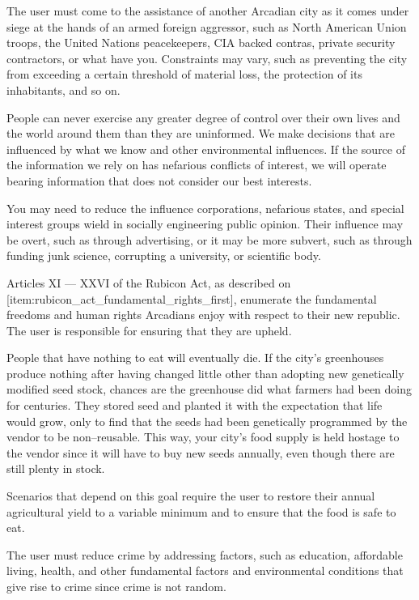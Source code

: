 
The user must come to the assistance of another Arcadian city as it comes under siege at the hands of an armed foreign aggressor, such as North American Union troops, the United Nations peacekeepers, CIA backed contras, private security contractors, or what have you. Constraints may vary, such as preventing the city from exceeding a certain threshold of material loss, the protection of its inhabitants, and so on.


People can never exercise any greater degree of control over their own lives and the world around them than they are uninformed. We make decisions that are influenced by what we know and other environmental influences. If the source of the information we rely on has nefarious conflicts of interest, we will operate bearing information that does not consider our best interests.

You may need to reduce the influence corporations, nefarious states, and special interest groups wield in socially engineering public opinion. Their influence may be overt, such as through advertising, or it may be more subvert, such as through funding junk science, corrupting a university, or scientific body.


Articles XI --- XXVI of the Rubicon Act, as described on [item:rubicon_act_fundamental_rights_first], enumerate the fundamental freedoms and human rights Arcadians enjoy with respect to their new republic. The user is responsible for ensuring that they are upheld.


People that have nothing to eat will eventually die. If the city's greenhouses produce nothing after having changed little other than adopting new genetically modified seed stock, chances are the greenhouse did what farmers had been doing for centuries. They stored seed and planted it with the expectation that life would grow, only to find that the seeds had been genetically programmed by the vendor to be non--reusable. This way, your city's food supply is held hostage to the vendor since it will have to buy new seeds annually, even though there are still plenty in stock.

Scenarios that depend on this goal require the user to restore their annual agricultural yield to a variable minimum and to ensure that the food is safe to eat.


The user must reduce crime by addressing factors, such as education, affordable living, health, and other fundamental factors and environmental conditions that give rise to crime since crime is not random.


